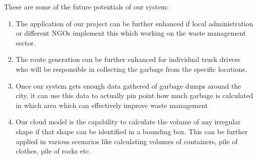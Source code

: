 These are some of the future potentials of our system:
\begin{enumerate}
    \item The application of our project can be further enhanced if local administration or different NGOs implement this which working on the waste management sector.
 
    \item The route generation can be further enhanced for individual truck drivers who will be responsible in collecting the garbage from the specific locations. 

    \item Once our system gets enough data gathered of garbage dumps around the city, it can use this data to actually pin point how much garbage is calculated in which area which can effectively improve waste management

    \item Our cloud model is the capability to calculate the volume of any irregular shape if that shape can be identified in a bounding box. This can be further applied in various scenarios like calculating volumes of containers, pile of clothes, pile of rocks etc.
\end{enumerate}